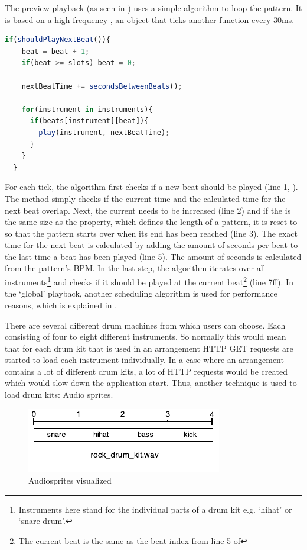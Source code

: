 The preview playback (as seen in ) uses a simple algorithm to loop the pattern. It is based on a high-frequency , an object that ticks another function every 30ms.

\begin{lstlisting}[language=JavaScript, caption=A pattern's loop algorithm, label=lst:pattern-loop]
  if(shouldPlayNextBeat()){
    beat = beat + 1;
    if(beat >= slots) beat = 0;

    nextBeatTime += secondsBetweenBeats();

    for(instrument in instruments){
      if(beats[instrument][beat]){
        play(instrument, nextBeatTime);
      }
    }
  }
\end{lstlisting}

For each tick, the algorithm first checks if a new beat should be played (line 1, ). The method simply checks if the current time and the calculated time for the next beat overlap. Next, the current  needs to be increased (line 2) and if the  is the same size as the  property, which defines the length of a pattern, it is reset to  so that the pattern starts over when its end has been reached (line 3). The exact time for the next beat is calculated by adding the amount of seconds per beat to the last time a beat has been played (line 5). The amount of seconds is calculated from the pattern's BPM. In the last step, the algorithm iterates over all instruments\footnote{Instruments here stand for the individual parts of a drum kit e.g. `hihat' or `snare drum'.} and checks if it should be played at the current beat\footnote{The current beat is the same as the beat index from line 5 of } (line 7ff). In the `global' playback, another scheduling algorithm is used for  performance reasons, which is explained in .

There are several different drum machines from which users can choose. Each consisting of four to eight different instruments. So normally this would mean that for each drum kit that is used in an arrangement HTTP GET requests are started to load each instrument individually. In a case where an arrangement contains a lot of different drum kits, a lot of HTTP requests would be created which would slow down the application start. Thus, another technique is used to load drum kits: Audio sprites.

\begin{figure}[htb]
  \centerline{\includegraphics[width=0.9\linewidth]{images/drumkit_wav.pdf}}
  \caption[Audiosprites visualized]{Audiosprites visualized}
  \label{fig:audiosprites}
\end{figure}

